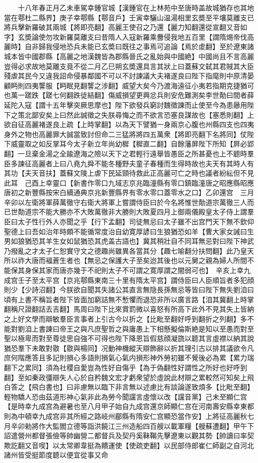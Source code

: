 　　十八年春正月乙未車駕幸鍾官城【漢鍾官在上林苑中至唐時盖故城猶存也其地當在鄠杜二縣界】庚子幸鄠縣【鄠音戶】壬寅幸驪山温湯相里玄奬至平壤莫離支已將兵擊新羅破其兩城【將即亮翻】高麗王使召之乃還【麗力知翻還從宣翻又音如字】玄奬論使勿攻新羅莫離支曰昔隋人入寇新羅乘釁侵我地五百里【謂隋焬帝伐高麗時】自非歸我侵地恐兵未能已玄奬曰既往之事焉可追論【焉於䖍翻】至於遼東諸城本皆中國郡縣【高麗之地漢魏皆為郡縣晉氏之亂始與中國絶】中國尚且不言高麗豈得必求故地莫離支竟不從二月乙巳朔玄奬還具言其狀上曰蓋蘇文弑其君賊其大臣殘虐其民今又違我詔命侵暴鄰國不可以不討諫議大夫褚遂良曰陛下指麾則中原清晏顧眄則四夷讋服【眄眠見翻讋之涉翻】威望大矣今乃渡海遠征小夷若指期克捷猶可也萬一蹉跌【蹉七何翻跌徒結翻】傷威損望更興忿兵則安危難測矣李世勣曰間者薛延陀入寇【謂十五年擊突厥思摩也】陛下欲發兵窮討魏徵諫而止使至今為患曏用陛下之策北鄙安矣上曰然此誠徵之失朕尋悔之而不欲言恐塞良謀故也【塞悉則翻】上欲自征高麗褚遂良上疏【上時掌翻】以為天下譬猶一身兩京心腹也州縣四支也四夷身外之物也高麗罪大誠當致討但命二三猛將將四五萬衆【將即亮翻下名將同】仗陛下威靈取之如反掌耳今太子新立年尚幼穉【穉直二翻】自餘藩屏陛下所知【屛必郢翻】一旦棄金湯之全踰遼海之險以天下之君輕行遠舉皆愚臣之所甚憂也上不聼時羣臣多諫征高麗者上曰八堯九舜不能冬種野夫童子春種而生得時故也夫天有其時人有其功【夫天音扶】蓋蘇文陵上虐下民延頸待救此正高麗可亡之時也議者紛紜但不見此耳　己酉上幸靈口【新書作零口九域志京兆臨潼縣有零口鎮臨潼唐之昭應縣昭應唐初之新豐縣按宋白續通典京兆新豐縣界有零水零口蓋零水之口】乙卯還宫　三月辛卯以左衛將軍薛萬徹守右衛大將軍上嘗謂侍臣曰於今名將惟世勣道宗萬徹三人而已世勣道宗不能大勝亦不大敗萬徹非大勝則大敗夏四月上御兩儀殿皇太子侍上謂羣臣曰太子性行外人亦聞之乎【行下孟翻】司徒無忌曰太子雖不出宫門天下無不欽仰聖德上曰吾如治年時頗不能循常度治自幼寛厚諺曰生狼猶恐如羊【曹大家女誡曰生男如狼猶恐其羊生女如鼠猶恐其虎盖古語也】冀其稍壯自不同耳無忌對曰陛下神武乃撥亂之才太子仁恕實守文之德趣尚雖異各當其分【趣七喻翻分扶問翻】此乃皇天所以祚大唐而褔蒼生者也【無忌之保護大子至矣迨其後也以元舅之親為婦人所間不能保其身保其家而唐亦幾于不祀則太子不可謂之寛厚謂之闇弱可也】　辛亥上幸九成宫壬子至太平宫【京兆鄠縣東南三十里有隋太平宫】謂侍臣曰人臣順旨者多犯顔則少【少詩沼翻】今朕欲自聞其失諸公其直言無隐長孫無忌等皆曰陛下無失劉洎曰頃有上書不稱旨者陛下皆面加窮詰無不慙懼而退恐非所以廣言路【洎其冀翻上時掌翻稱尺證翻詰去吉翻】馬周曰陛下比來賞罰微以喜怒有所高下此外不見其失上皆納之上好文學而辯敏羣臣言事者上引古今以折之【比毗至翻好呼到翻折之列翻】多不能對劉洎上書諫曰帝王之與凡庶聖哲之與庸愚上下相懸擬倫斯絶是知以至愚而對至聖以極卑而對至尊徒思自強不可得也陛下降恩旨假慈顔凝旒以聼其言虛襟以納其說猶恐羣下未敢對敭【敭與楊同】况動神機縱天辯飾辭以折其理引古以排其議欲令凡庶何階應答且多記則損心多語則損氣心氣内損形神外勞初雖不覺後必為累【累力瑞翻下之累同】須為社稷自愛豈為性好自傷乎【為于偽翻性好謂性之所好也好呼到翻】至如秦政彊辯失人心於自矜魏文宏才虧衆望於虛說此材辯之累較然可知矣上飛白答之【飛白書也】曰非慮無以臨下非言無以述慮比有談論遂致煩多【比毗至翻】輕物驕人恐由茲道形神心氣非此為勞今聞讜言虛懷以改【讜音黨】己未至顯仁宫【是時幸九成宫為避暑也至八月甲子始自九成宫還京師顯仁宫在河南壽安縣幸東都則為中頓幸九成宫非其所經之路岐州郿縣有隋安仁宫顯恐當作安】上將征高麗秋七月辛卯勑將作大監閻立德等詣洪饒江三州造船四百艘以載軍糧【艘蘇遭翻】甲午下詔遣營州都督張儉等帥幽營二都督兵及契丹奚靺鞨先擊遼東以觀其勢【帥讀曰率契欺訖翻又音喫】以太常卿韋挺為饋運使【使疏吏翻】以民部侍郎崔仁師副之自河北諸州皆受挺節度聼以便宜從事又命